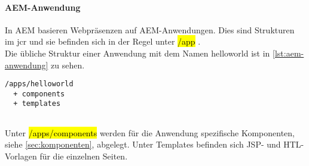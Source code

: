 \paragraph{AEM-Anwendung}
In AEM basieren Webpräsenzen auf AEM-Anwendungen. Dies sind Strukturen im \ac{jcr} und sie befinden sich in der Regel unter \hl{/app} \cite[S. 6.4]{Incorporated2015}. \\
Die übliche Struktur einer Anwendung mit dem Namen helloworld ist in \autoref{lst:aem-anwendung} zu sehen.

\begin{lstlisting}[style=jcr,caption=Exemplarische Darstellung einer AEM Anwendung, label=lst:aem-anwendung]
/apps/helloworld
  + components
  + templates
  
\end{lstlisting}

Unter \hl{/apps/components} werden für die Anwendung spezifische Komponenten, siehe \autoref{sec:komponenten}, abgelegt. Unter Templates befinden sich JSP- und HTL- Vorlagen für die einzelnen Seiten.